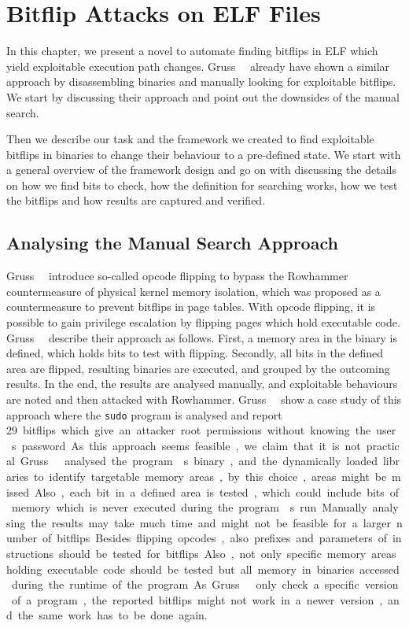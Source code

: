 \chapter{Bitflip Attacks on ELF Files}\label{sec:elfattack}

In this chapter, we present a novel to automate finding bitflips in ELF which
yield exploitable execution path changes. Gruss~\etal~\cite{flipinthewall}
already have shown a similar approach by disassembling binaries and manually
looking for exploitable bitflips. We start by discussing their approach and
point out the downsides of the manual search.

Then we describe our task and the framework we created to find exploitable
bitflips in binaries to change their behaviour to a pre-defined state. We start
with a general overview of the framework design and go on with discussing the
details on how we find bits to check, how the definition for searching works,
how we test the bitflips and how results are captured and verified.

\section{Analysing the Manual Search Approach}

Gruss~\etal~\cite{flipinthewall} introduce so-called opcode flipping to bypass
the Rowhammer countermeasure of physical kernel memory isolation, which was
proposed as a countermeasure to prevent bitflips in page tables. With opcode
flipping, it is possible to gain privilege escalation by flipping pages which
hold executable code. Gruss~\etal~\cite{flipinthewall} describe their approach
as follows. First, a memory area in the binary is defined, which holds bits to
test with flipping. Secondly, all bits in the defined area are flipped,
resulting binaries are executed, and grouped by the outcoming results. In the
end, the results are analysed manually, and exploitable behaviours are noted and
then attacked with Rowhammer. Gruss~\etal~\cite{flipinthewall} show a case study
of this approach where the \texttt{sudo} program is analysed and report \SI{29}
bitflips which give an attacker root permissions without knowing the
user\textquotesingle s password.

As this approach seems feasible, we claim that it is not practical.
Gruss~\etal~\cite{flipinthewall} analysed the program\textquotesingle s binary,
and the dynamically loaded libraries to identify targetable memory areas, by
this choice, areas might be missed. Also, each bit in a defined area is tested,
which could include bits of memory which is never executed during the
program\textquotesingle s run. Manually analysing the results may take much time
and might not be feasible for a larger number of bitflips. Besides flipping
opcodes, also prefixes and parameters of instructions should be tested for
bitflips. Also, not only specific memory areas holding executable code should be
tested but all memory in binaries accessed during the runtime of the program. As
Gruss~\etal~\cite{flipinthewall} only check a specific version of a program,
the reported bitflips might not work in a newer version, and the same work has
to be done again.

